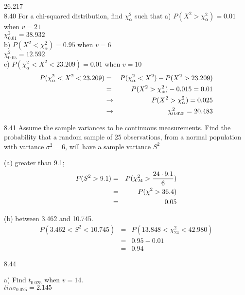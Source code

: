 26.217 \\

8.40 For a chi-squared distribution, find $\chi_\alpha^2$ such that
a) $P(X^2 > \chi_\alpha^2) = 0.01$ when $v = 21$ \\

$\chi_{0.01}^2 = 38.932$ \\

b) $P(X^2 < \chi_\alpha^2) = 0.95$ when $v = 6$ \\

$\chi^2_{0.05} = 12.592$ \\

c) $P(\chi_\alpha^2 < X^2 < 23.209) = 0.01$ when $v = 10$ \\
\begin{eqnarray*}
P(\chi_\alpha^2 < X^2 < 23.209) & = & P(\chi_\alpha^2 < X^2) - P( X^2 > 23.209) \\
& = & P(X^2 > \chi^2_\alpha) - 0.015 = 0.01 \\ 
& \rightarrow & P(X^2 > \chi^2_\alpha) = 0.025 \\
& \rightarrow & \chi_{0.025}^2 = 20.483
\end{eqnarray*}

8.41 Assume the sample variances to be continuous
measurements. Find the probability that a random
sample of 25 observations, from a normal population
with variance $\sigma^2 = 6$, will have a sample variance $S^2$ 

(a) greater than 9.1; \\

\begin{eqnarray*}
P(S^2 > 9.1) & = & P(\chi^2_{24} > \frac{24 \cdot 9.1}{6}) \\
  &= & P(\chi^2 > 36.4) \\
  & = & 0.05 
\end{eqnarray*}

(b) between 3.462 and 10.745. \\


\begin{eqnarray*}
P(3.462 < S^2 < 10.745) & = & P(13.848 < \chi^2_{24} < 42.980) \\
  & = & 0.95 - 0.01 \\
  & = & 0.94
\end{eqnarray*}

8.44 

a) Find $t_{0.025}$ when $v = 14$. \\

$tinv_{0.025} = 2.145$ \\

